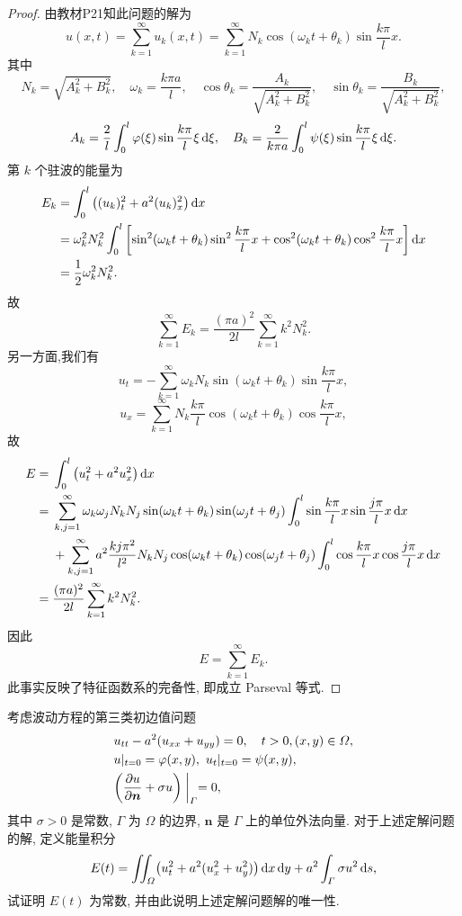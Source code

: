 \begin{proof}
  由教材P21知此问题的解为
  \[u(x,t) = \sum_{k=1}^{\infty}u_k(x,t)
    = \sum_{k=1}^{\infty}N_k\cos(\omega_k t+\theta_k)\sin\frac{k\pi}{l}x.\]
  其中
  \[N_k = \sqrt{A_k^2+B_k^2}, \quad \omega_k=\frac{k\pi a}{l},
    \quad \cos\theta_k = \frac{A_k}{\sqrt{A_k^2+B_k^2}},
    \quad \sin\theta_k = \frac{B_k}{\sqrt{A_k^2+B_k^2}},\]
  \[A_k = \frac{2}{l}\int_0^l\varphi(\xi)\sin\frac{k\pi}{l}\xi\mathop{}\!\mathrm{d}\xi,
  \quad B_k = \frac{2}{k\pi a}\int_0^l\psi(\xi)\sin\frac{k\pi}{l}\xi\mathop{}\!\mathrm{d}\xi.\]
  第 $k$ 个驻波的能量为
  \[\begin{split}
    E_k
    & = \int_0^l\left((u_k)_t^2+a^2(u_k)_x^2\right)\mathop{}\!\mathrm{d} x \\
    & = \omega_k^2N_k^2\int_0^l\left[\sin^2(\omega_kt+\theta_k)\sin^2\frac{k\pi}{l}x
        + \cos^2(\omega_kt+\theta_k)\cos^2\frac{k\pi}{l}x\right]\mathop{}\!\mathrm{d} x \\
    & = \frac{1}{2}\omega_k^2N_k^2.
  \end{split}\]
  故
  \[\sum_{k=1}^{\infty} E_k = \frac{(\pi a)^2}{2l}\sum_{k=1}^{\infty}k^2N_k^2.\]
  另一方面,我们有
  \[u_t = -\sum_{k=1}^{\infty}\omega_kN_k\sin(\omega_kt+\theta_k)\sin\frac{k\pi}{l}x,\]
  \[u_x = \sum_{k=1}^{\infty}N_k\frac{k\pi}{l}\cos(\omega_kt+\theta_k)\cos\frac{k\pi}{l}x,\]
  故
  \begin{align*}
    E ={} & \int_0^l \left(u_t^2+a^2u_x^2\right)\mathop{}\!\mathrm{d} x \\
      ={} & \sum_{k,j=1}^{\infty} \omega_k\omega_jN_kN_j\sin(\omega_kt
            +\theta_k)\sin(\omega_jt+\theta_j)
            \int_0^l \sin\frac{k\pi}{l}x\sin\frac{j\pi}{l}x\mathop{}\!\mathrm{d} x \\
          & + \sum_{k,j=1}^{\infty} a^2\frac{kj\pi^2}{l^2}N_kN_j\cos(\omega_kt+\theta_k)
            \cos(\omega_jt+\theta_j) \int_0^l \cos\frac{k\pi}{l}x
            \cos\frac{j\pi}{l}x\mathop{}\!\mathrm{d} x \\
      ={} & \frac{(\pi a)^2}{2l}\sum_{k=1}^{\infty}k^2N_k^2.
  \end{align*}
  因此
  \[E = \sum_{k=1}^{\infty}E_k.\]
  此事实反映了特征函数系的完备性, 即成立 Parseval 等式.
\end{proof}


\begin{exercise}
  考虑波动方程的第三类初边值问题
  \begin{align*}
    & u_{tt} - a^2(u_{xx}+u_{yy}) = 0,\quad t>0, (x,y)\in\varOmega, \\
    & u|_{t=0} = \varphi(x,y),\ u_t|_{t=0} = \psi(x,y), \\
    & \biggl(\frac{\partial u}{\partial \bm{n}}+\sigma u\biggr)\biggm|_{\varGamma} = 0,
  \end{align*}
  其中 $\sigma>0$ 是常数, $\varGamma$ 为 $\varOmega$ 的边界,
  $\bm{n}$ 是 $\varGamma$ 上的单位外法向量. 对于上述定解问题的解, 定义能量积分
  \[E(t) = \iint_{\varOmega} \bigl(u_t^2+a^2(u_x^2+u_y^2)\bigr)\mathop{}\!\mathrm{d} x\mathop{}\!\mathrm{d} y
    + a^2\int_{\varGamma} \sigma u^2\mathop{}\!\mathrm{d} s,\]
  试证明 $E(t)$ 为常数, 并由此说明上述定解问题解的唯一性.
\end{exercise}

